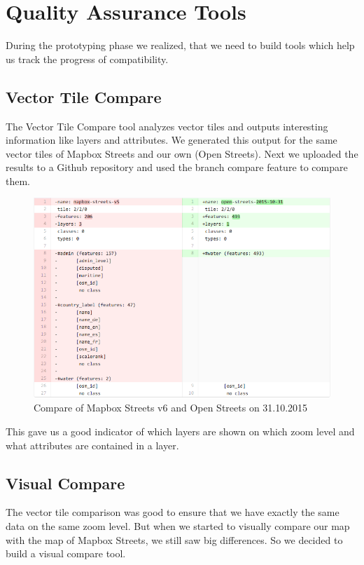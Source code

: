 \section{Quality Assurance Tools}\label{tools}
During the prototyping phase we realized, that we need to build tools which help us track the progress of compatibility.

\subsection{Vector Tile Compare}\label{vector_tile_compare}
The Vector Tile Compare tool analyzes vector tiles and outputs interesting information like layers and attributes. We generated this output for the same vector tiles of Mapbox Streets and our own (Open Streets). Next we uploaded the results to a Github repository and used the branch compare feature to compare them. 

\begin{figure}[H]
  \centering
  \includegraphics[width=1\textwidth]{images/vector_tile_compare.png}
  \caption{Compare of Mapbox Streets v6 and Open Streets on 31.10.2015}
\end{figure}

This gave us a good indicator of which layers are shown on which zoom level and what attributes are contained in a layer.

\subsection{Visual Compare}\label{visual_compare}
The vector tile comparison was good to ensure that we have exactly the same data on the same zoom level. But when we started to visually compare our map with the map of Mapbox Streets, we still saw big differences. So we decided to build a visual compare tool. 

